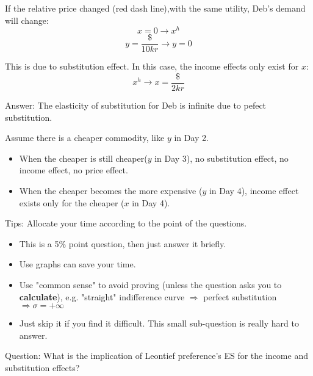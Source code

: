 \documentclass{article}
\begin{document}
\begin{mdframed}[backgroundcolor=blue!20,linecolor=white]
\begin{center}
\label{fig:fair}
\end{center}

\vspace{2mm}


If the relative price changed (red dash line),with the same utility, Deb's demand will change:
$$x=0 \to x^h$$
$$y=\frac{\$}{10 kr} \to y= 0$$

This is due to substitution effect. In this case, the income effects only exist for $x$:
$$x^h \to x= \frac{\$}{2kr}$$

\end{mdframed}

Answer: The elasticity of substitution for Deb is infinite due to pefect substitution.

Assume there is a cheaper commodity, like $y$ in Day 2.
\begin{itemize}
\item When the cheaper is still cheaper($y$ in Day 3), no substitution effect, no income effect, no price effect.
\item When the cheaper becomes the more expensive ($y$ in Day 4),  income effect exists only for the cheaper ($x$ in Day 4).
\end{itemize}

\begin{mdframed}[backgroundcolor=yellow!20,linecolor=white]
Tips: Allocate your time according to the point of the questions.
\begin{itemize}
\item This is a 5\% point question, then just answer it briefly. 
\item Use graphs can save your time.
\item Use "common sense" to avoid proving (unless the question asks you to \textbf{calculate}), e.g. "straight" indifference curve  $\Rightarrow$ perfect substitution $\Rightarrow \sigma = + \infty $ 
\item Just skip it if you find it difficult. This small sub-question is really hard to answer.
\end{itemize}



\end{mdframed}

\begin{mdframed}[backgroundcolor=blue!20,linecolor=white]
Question: What is the implication of Leontief preference's ES for the income and substitution effects? 
\end{mdframed}
\end{document}
